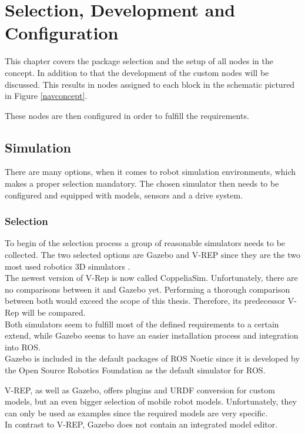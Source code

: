 \chapter{Selection, Development and Configuration}
\label{Selection}

This chapter covers the package selection and the setup of all nodes in the concept. In addition to that the development of the custom nodes will be discussed. This results in nodes assigned to each block in the schematic pictured in Figure \ref{navconcept}.

These nodes are then configured in order to fulfill the requirements.

\section{Simulation}
There are many options, when it comes to robot simulation environments, which makes a proper selection mandatory. The chosen simulator then needs to be configured and equipped with models, sensors and a drive system.

\subsection{Selection}
To begin of the selection process a group of reasonable simulators needs to be collected. The two selected options are Gazebo and V-REP since they are the two most used robotics 3D simulators \cite{SimComp}.\\
The newest version of V-Rep is now called CoppeliaSim. Unfortunately, there are no comparisons between it and Gazebo yet. Performing a thorough comparison between both would exceed the scope of this thesis. Therefore, its predecessor V-Rep will be compared. \\

Both simulators seem to fulfill most of the defined requirements to a certain extend, while Gazebo seems to have an easier installation process and integration into ROS.\\
Gazebo is included in the default packages of ROS Noetic since it is developed by the Open Source Robotics Foundation as the default simulator for ROS\cite{ROSPkg}.

V-REP, as well as Gazebo, offers plugins and URDF conversion for custom models, but an even bigger selection of mobile robot models. Unfortunately, they can only be used as examples since the required models are very specific.\\
In contrast to V-REP, Gazebo does not contain an integrated model editor.

